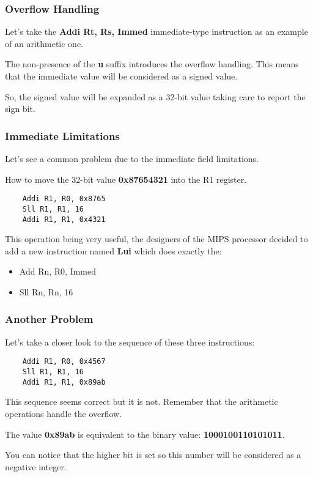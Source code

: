 
\begin{frame}
  \frametitle{Overflow Handling}

  Let's take the \textbf{Addi Rt, Rs, Immed} immediate-type
  instruction as an example of an arithmetic one.

  \nl

  The non-presence of the \textbf{u} suffix introduces the overflow
  handling. This means that the immediate value will be considered
  as a signed value.

  \nl

  So, the signed value will be expanded as a 32-bit value taking care
  to report the sign bit.

  \begin{center}
  \end{center}
\end{frame}


\begin{frame}[containsverbatim]
  \frametitle{Immediate Limitations}

  Let's see a common problem due to the immediate field limitations.

  \nl

  How to move the 32-bit value \textbf{0x87654321} into the R1 register.

  \begin{verbatim}
    Addi R1, R0, 0x8765
    Sll R1, R1, 16
    Addi R1, R1, 0x4321
  \end{verbatim}

  This operation being very useful, the designers of the MIPS processor
  decided to add a new instruction named \textbf{Lui} which does
  exactly the:

  \begin{itemize}
    \item
      Add Rn, R0, Immed
    \item
      Sll Rn, Rn, 16
  \end{itemize}
\end{frame}


\begin{frame}[containsverbatim]
  \frametitle{Another Problem}

  Let's take a closer look to the sequence of these three instructions:

  \begin{verbatim}
    Addi R1, R0, 0x4567
    Sll R1, R1, 16
    Addi R1, R1, 0x89ab
  \end{verbatim}

  This sequence seems correct but it is not. Remember that the arithmetic
  operations handle the overflow.

  \nl

  The value \textbf{0x89ab} is equivalent to the binary value:
  \textbf{1000100110101011}.

  \nl

  You can notice that the higher bit is set so this number will be considered
  as a negative integer.
\end{frame}

